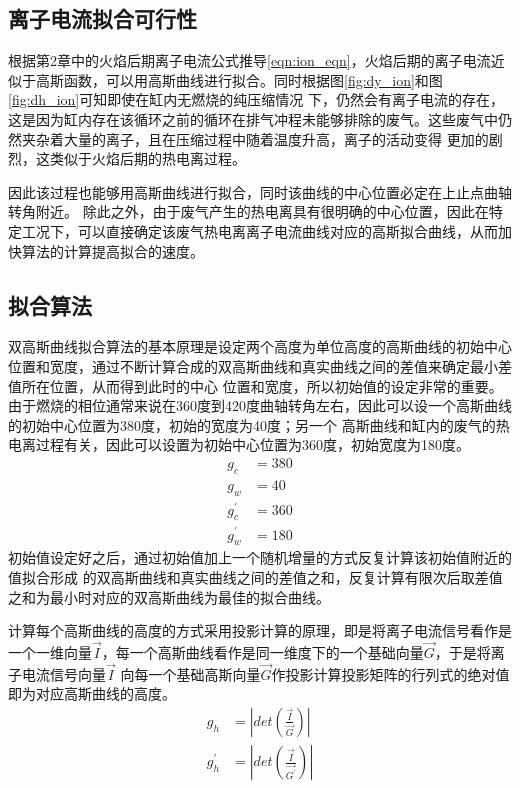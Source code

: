 \subsection{离子电流拟合可行性}
根据第2章中的火焰后期离子电流公式推导\ref{eqn:ion_eqn}，火焰后期的离子电流近似于高斯函数，可以用高斯曲线进行拟合。同时根据图\ref{fig:dy_ion}和图\ref{fig:dh_ion}可知即使在缸内无燃烧的纯压缩情况
下，仍然会有离子电流的存在，这是因为缸内存在该循环之前的循环在排气冲程未能够排除的废气。这些废气中仍然夹杂着大量的离子，且在压缩过程中随着温度升高，离子的活动变得
更加的剧烈，这类似于火焰后期的热电离过程。\par
因此该过程也能够用高斯曲线进行拟合，同时该曲线的中心位置必定在上止点曲轴转角附近。
除此之外，由于废气产生的热电离具有很明确的中心位置，因此在特定工况下，可以直接确定该废气热电离离子电流曲线对应的高斯拟合曲线，从而加快算法的计算提高拟合的速度。
\subsection{拟合算法}
双高斯曲线拟合算法的基本原理是设定两个高度为单位高度的高斯曲线的初始中心位置和宽度，通过不断计算合成的双高斯曲线和真实曲线之间的差值来确定最小差值所在位置，从而得到此时的中心
位置和宽度，所以初始值的设定非常的重要。
由于燃烧的相位通常来说在360度到420度曲轴转角左右，因此可以设一个高斯曲线的初始中心位置为380度，初始的宽度为40度；另一个
高斯曲线和缸内的废气的热电离过程有关，因此可以设置为初始中心位置为360度，初始宽度为180度。
\begin{align}
	g_{c} &= 380\\
	g_{w} &= 40\\
	g_{c}^{'} &= 360\\
	g_{w}^{'} &= 180
\end{align}
初始值设定好之后，通过初始值加上一个随机增量的方式反复计算该初始值附近的值拟合形成
的双高斯曲线和真实曲线之间的差值之和，反复计算有限次后取差值之和为最小时对应的双高斯曲线为最佳的拟合曲线。\par
计算每个高斯曲线的高度的方式采用投影计算的原理，即是将离子电流信号看作是一个一维向量$\vec{I}$，每一个高斯曲线看作是同一维度下的一个基础向量$\vec{G}$，于是将离子电流信号向量$\vec{I}$
向每一个基础高斯向量$\vec{G}$作投影计算投影矩阵的行列式的绝对值即为对应高斯曲线的高度。
\begin{align}
	g_{h} &= |det(\frac{\vec{I}}{\vec{G}})|\\
	g_{h}^{'} &= |det(\frac{\vec{I}}{\vec{G^{'}}})|
\end{align}
